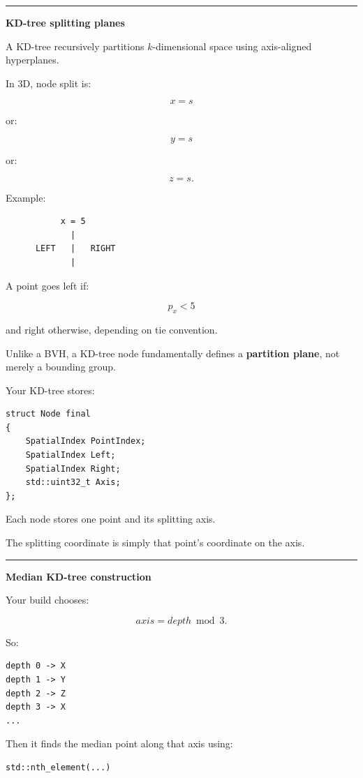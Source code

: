 \begin{center}\rule{0.5\linewidth}{0.5pt}\end{center}

\textbf{KD-tree splitting planes}

A KD-tree recursively partitions \(k\)-dimensional space using axis-aligned hyperplanes.

In 3D, node split is:

\[
x=s
\]

or:

\[
y=s
\]

or:

\[
z=s.
\]

Example:

\begin{verbatim}
           x = 5
             |
      LEFT   |   RIGHT
             |
\end{verbatim}

A point goes left if:

\[
p_x<5
\]

and right otherwise, depending on tie convention.

Unlike a BVH, a KD-tree node fundamentally defines a \textbf{partition plane}, not merely a bounding group.

Your KD-tree stores:

\begin{verbatim}
struct Node final
{
    SpatialIndex PointIndex;
    SpatialIndex Left;
    SpatialIndex Right;
    std::uint32_t Axis;
};
\end{verbatim}

Each node stores one point and its splitting axis.

The splitting coordinate is simply that point's coordinate on the axis.

\begin{center}\rule{0.5\linewidth}{0.5pt}\end{center}

\textbf{Median KD-tree construction}

Your build chooses:

\[
axis=depth\bmod3.
\]

So:

\begin{verbatim}
depth 0 -> X
depth 1 -> Y
depth 2 -> Z
depth 3 -> X
...
\end{verbatim}

Then it finds the median point along that axis using:

\begin{verbatim}
std::nth_element(...)
\end{verbatim}

